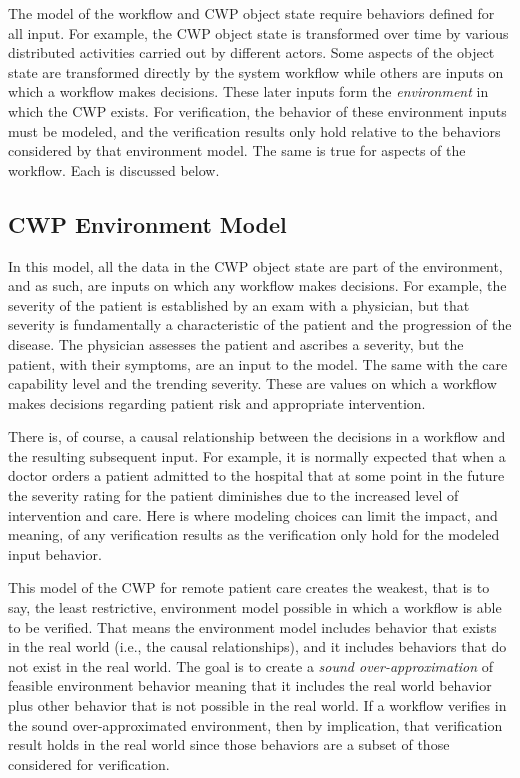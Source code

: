 The model of the workflow and CWP object state require behaviors defined for all input. For example, the CWP object state is transformed over time by various distributed activities carried out by different actors. Some aspects of the object state are transformed directly by the system workflow while others are inputs on which a workflow makes decisions. These later inputs form the \emph{environment} in which the CWP exists. For verification, the behavior of these environment inputs must be modeled, and the verification results only hold relative to the behaviors considered by that environment model. The same is true for aspects of the workflow. Each is discussed below.

\subsection{CWP Environment Model}
In this model, all the data in the CWP object state are part of the environment, and as such, are inputs on which any workflow makes decisions. For example, the severity of the patient is established by an exam with a physician, but that severity is fundamentally a characteristic of the patient and the progression of the disease. The physician assesses the patient and ascribes a severity, but the patient, with their symptoms, are an input to the model. The same with the care capability level and the trending severity. These are values on which a workflow makes decisions regarding patient risk and appropriate intervention. 

There is, of course, a causal relationship between the decisions in a workflow and the resulting subsequent input. For example, it is normally expected that when a doctor orders a patient admitted to the hospital that at some point in the future the severity rating for the patient diminishes due to the increased level of intervention and care. Here is where modeling choices can limit the impact, and meaning, of any verification results as the verification only hold for the modeled input behavior.

This model of the CWP for remote patient care creates the weakest, that is to say, the least restrictive, environment model possible in which a workflow is able to be verified. That means the environment model includes behavior that exists in the real world (i.e., the causal relationships), and it includes behaviors that do not exist in the real world. The goal is to create a \emph{sound over-approximation} of feasible environment behavior meaning that it includes the real world behavior plus other behavior that is not possible in the real world. If a workflow verifies in the sound over-approximated environment, then by implication, that verification result holds in the real world since those behaviors are a subset of those considered for verification. 

